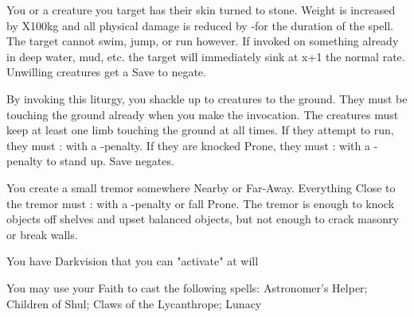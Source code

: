 {You or a creature you target has their skin turned to stone.  Weight is increased by \DICE X100kg and all physical damage is reduced by -\DICE for the duration of the spell.  The target cannot swim, jump, or run however. If invoked on something already in deep water, mud, etc. the target will immediately sink at x\DICE+1 the normal rate. Unwilling creatures get a Save to negate. 

\LITURGY [
  Name= Terrestrial Shackle,
  Link=raimonds-liturgy-terrestrial-shackle,
  Paradigm= Elements ,
  Save=  Y (negates) ,
  Duration= Markovian ,
  Counter=  n/a  ,
  Keywords= Splittable ,
  Target=   Close; Nearby; or Far-Away creatures
]



By invoking this liturgy, you shackle up to \DICE creatures to the ground.  They must be touching the ground already when you make the invocation.  The creatures must keep at least one limb touching the ground at all times.  If they attempt to run, they must \RB : \DEX with a -\DICE penalty.  If they are knocked Prone, they must \RB : \VIG with a -\DICE penalty to stand up.  Save negates.

\LITURGY [
  Name= Tremor,
  Link=raimonds-liturgy-tremor,
  Paradigm= Elements ,
  Save=  N ,
  Duration= 0 ,
  Counter=  n/a  ,
  Keywords= Contested ,
  Target=   Nearby or Far Away point
]



You create a small tremor somewhere Nearby or Far-Away.  Everything Close to the tremor must \RB : \DEX with a -\DICE penalty or fall Prone.  The tremor is enough to knock objects off shelves and upset balanced objects, but not enough to crack masonry or break walls.



\GOD[
Name=Shul,
Link=small-god-shul,
GodOf=Seraph of Moonlight,
Holy=3 pearl earrings hung from either ear
]


You have Darkvision that you can "activate" at will


You may use your Faith to cast the following spells: Astronomer's Helper; Children of Shul; Claws of the Lycanthrope; Lunacy

\LITURGY [
  Name= Astrologer's Helper,
  Link= shul-liturgy-astrologers-helper,
  Paradigm= Prophesy ,
  Save=  N ,
  Duration= Session ,
  Counter=  n/a  ,
  Keywords= Splittable ,
  Target=   Self / Close creature(s)
]



}
